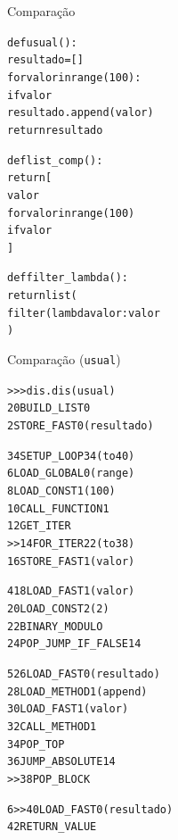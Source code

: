 \documentclass[11pt]{beamer}
\begin{document}
\begin{frame}[fragile]{Comparação}
  \begin{alltt}\scriptsize
def usual():
    resultado = []
    for valor in range(100):
        if valor %
            resultado.append(valor)
    return resultado

def list_comp():
    return [
        valor
        for valor in range(100)
        if valor %
    ]

def filter_lambda():
    return list(
        filter(lambda valor: valor %
    )
\end{alltt}
\end{frame}

\begin{frame}[fragile]{Comparação (\texttt{usual})}
\vspace*{-.25cm}
  \begin{alltt}\tiny
>>> dis.dis(usual)
  2           0 BUILD_LIST               0
              2 STORE_FAST               0 (resultado)

  3           4 SETUP_LOOP              34 (to 40)
              6 LOAD_GLOBAL              0 (range)
              8 LOAD_CONST               1 (100)
             10 CALL_FUNCTION            1
             12 GET_ITER
        >>   14 FOR_ITER                22 (to 38)
             16 STORE_FAST               1 (valor)

  4          18 LOAD_FAST                1 (valor)
             20 LOAD_CONST               2 (2)
             22 BINARY_MODULO
             24 POP_JUMP_IF_FALSE       14

  5          26 LOAD_FAST                0 (resultado)
             28 LOAD_METHOD              1 (append)
             30 LOAD_FAST                1 (valor)
             32 CALL_METHOD              1
             34 POP_TOP
             36 JUMP_ABSOLUTE           14
        >>   38 POP_BLOCK

  6     >>   40 LOAD_FAST                0 (resultado)
             42 RETURN_VALUE
\end{alltt}
\end{frame}
\end{document}
